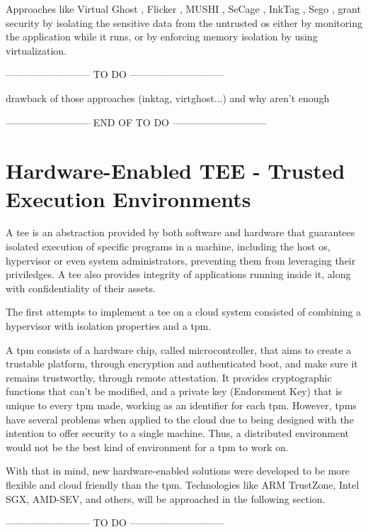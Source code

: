 Approaches like Virtual Ghost \cite{virtGhostPaper}, Flicker \cite{flickerPaper}, MUSHI \cite{mushiPaper}, SeCage \cite{SeCagePaper}, InkTag \cite{inkTagPaper}, Sego \cite{segoPaper}, grant security by isolating the sensitive data from the untrusted \gls{os} either by monitoring the application while it runs, or by enforcing memory isolation by using virtualization.


-------------------------- TO DO -----------------------------

			drawback of those approaches (inktag, virtghost...)
			and why aren't enough
			
-------------------------- END OF TO DO -----------------------------

\section{Hardware-Enabled TEE - Trusted Execution Environments}

A \gls{tee} is an abstraction provided by both software and hardware that guarantees isolated execution of specific programs in a machine, including the host \gls{os}, hypervisor or even system administrators, preventing them from leveraging their priviledges. A \gls{tee} also provides integrity of applications running inside it, along with confidentiality of their assets.

The first attempts to implement a \gls{tee} on a cloud system consisted of combining a hypervisor with isolation properties and a \gls{tpm}. 

A \gls{tpm} \cite{tpmPaper} consists of a hardware chip, called microcontroller, that aims to create a trustable platform, through encryption and authenticated boot, and make sure it remains trustworthy, through remote attestation. 
It provides cryptographic functions that can't be modified, and a private key (Endorsment Key) that is unique to every \gls{tpm} made, working as an identifier for each \gls{tpm}.
However, \gls{tpm}s have several problems when applied to the cloud due to being designed with the intention to offer security to a single machine. Thus, a distributed environment would not be the best kind of environment for a \gls{tpm} to work on.

With that in mind, new hardware-enabled solutions were developed to be more flexible and cloud friendly than the \gls{tpm}. Technologies like ARM TrustZone, Intel SGX, AMD-SEV, and others, will be approached in the following section.

-------------------------- TO DO -----------------------------

